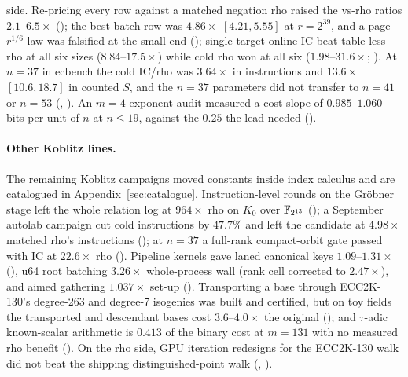 side. Re-pricing every row against a matched negation rho raised the vs-rho
ratios $2.1$--$6.5\times$ (); the
best batch row was $4.86\times$ $[4.21,5.55]$ at $r=2^{39}$, and a page
$r^{1/6}$ law was falsified at the small end
(); single-target online IC beat
table-less rho at all six sizes ($8.84$--$17.5\times$) while cold rho won at
all six ($1.98$--$31.6\times$; ).
At $n=37$ in ecbench the cold IC/rho was $3.64\times$ in instructions and
$13.6\times$ $[10.6,18.7]$ in counted $S$, and the $n=37$ parameters did not
transfer to $n=41$ or $n=53$
(,
). An $m=4$ exponent
audit measured a cost slope of $0.985$--$1.060$ bits per unit of $n$ at
$n\le19$, against the $0.25$ the lead needed
().

\paragraph{Other Koblitz lines.} The remaining Koblitz campaigns moved
constants inside index calculus and are catalogued in
Appendix~\ref{sec:catalogue}. Instruction-level rounds on the Gröbner stage
left the whole relation log at $964\times$ rho on $K_0$ over $\mathbb{F}_{2^{13}}$
(); a September autolab
campaign cut cold instructions by $47.7\%$ and left the candidate at
$4.98\times$ matched rho's instructions ();
at $n=37$ a full-rank compact-orbit gate passed with IC at $22.6\times$ rho
().
Pipeline kernels gave laned canonical keys $1.09$--$1.31\times$
(), u64 root batching
$3.26\times$ whole-process wall (rank cell corrected to $2.47\times$), and
aimed gathering $1.037\times$ set-up ().
Transporting a base through ECC2K-130's degree-263 and degree-7 isogenies
was built and certified, but on toy fields the transported and descendant
bases cost $3.6$--$4.0\times$ the original
(); and $\tau$-adic
known-scalar arithmetic is $0.413$ of the binary cost at $m=131$ with no
measured rho benefit
().
On the rho side, GPU iteration redesigns for the ECC2K-130 walk did not
beat the shipping distinguished-point walk
(,
).


